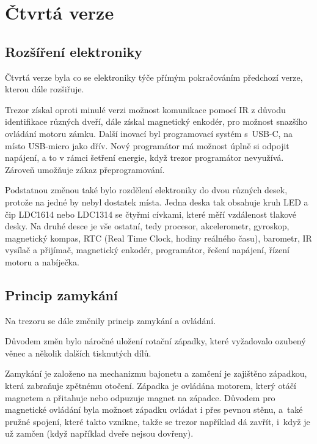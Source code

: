 \section{Čtvrtá verze}

\subsection{Rozšíření elektroniky}

Čtvrtá verze byla co se elektroniky týče přímým pokračováním předchozí verze, kterou dále rozšiřuje.

Trezor získal oproti minulé verzi možnost komunikace pomocí IR z důvodu identifikace růz\-ných dveří, dále získal magnetický enkodér, pro možnost snaz\-ší\-ho ovládání %
motoru zámku. 
Další inovací byl programovací systém s~USB-C, na místo USB-micro jako dřív. Nový programátor má možnost úplně si odpojit napáje\-ní, a to v rámci šetření 
energie, když trezor programátor nevyužívá. 
Zároveň umožňuje zákaz přeprogramování.

Podstatnou změnou také bylo rozdělení elektroniky do dvou různých desek, protože na jedné by nebyl dostatek místa. Jedna deska %
 tak obsahuje  
kruh LED a čip LDC1614 nebo LDC1314 se čtyřmi cívkami, které měří vzdálenost tlakové desky. Na druhé desce  %
je vše ostatní, tedy procesor, akcelerometr,
gyroskop, magnetický kompas, RTC (Real Time Clock, hodiny reálného času), barometr, IR vysílač a přijímač, magnetický enkodér, programátor, řešení 
napájení, řízení motoru a nabíječka. 


\subsection{Princip zamykání}

Na trezoru se dále změnily princip zamykání a ovládání. 

Důvodem změn bylo náročné uložení rotační západky, 
které vyžadovalo ozubený věnec a několik dalších tisknutých dílů.

Zamykání je založeno na mechanizmu bajonetu a zamčení je zajištěno západ\-kou, která zabraňuje zpětnému otočení.
Západka je ovládána motorem, který otáčí magnetem a přitahuje nebo odpuzuje magnet na západce. Důvodem pro magnetické ovládání
byla možnost západku ovládat i přes pevnou stěnu, a~také pružné spojení, které takto vznikne, takže se trezor například dá zavřít, i~když
je už zamčen (když například dveře nejsou dovřeny).

